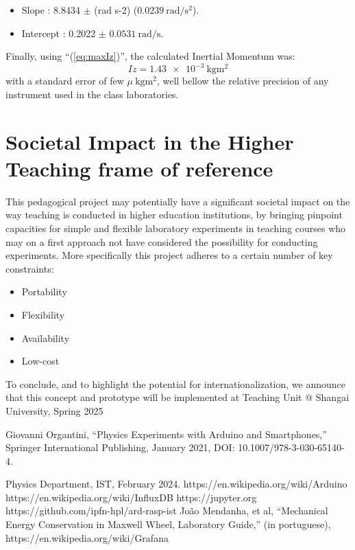 \documentclass[conference]{IEEEtran}
\begin{document}
\begin{itemize}
    \item Slope : 8.8434 $\pm$ (rad s-2) ($\SI{0.0239}{\radian\per\second\squared}$).

    \item Intercept : 0.2022 $\pm$ $\SI{0.0531}{\radian\per\second}$.
\end{itemize}

Finally, using ``(\eqref{eq:maxIz})'', the calculated Inertial Momentum was:
\begin{equation}
     Iz  = \SI{1.43e-3}{\kg\meter\squared}
\end{equation}
with a standard error of few $\mu\SI{}{\kg\meter\squared}$, well bellow the relative precision of any instrument used in the class laboratories.
  
\section{Societal Impact in the Higher Teaching frame of reference}
This pedagogical project may potentially have a significant societal impact on the way teaching is conducted in higher education institutions, 
by bringing pinpoint capacities for simple and flexible laboratory experiments in 
teaching courses who may on a first approach not have considered the possibility for conducting experiments.
More specifically this project adheres to a certain number of key constraints:
\begin{itemize}
    \item Portability
    \item Flexibility
    \item Availability
    \item Low-cost
\end{itemize}

To conclude, and to highlight the potential for internationalization, we announce that 
this concept and prototype will be implemented at Teaching Unit @ Shangai University, Spring 2025

\begin{thebibliography}{00}
Giovanni Organtini, ``Physics Experiments with Arduino and Smartphones,''
Springer International Publishing, January 2021, DOI: 10.1007/978-3-030-65140-4.

Physics Department, IST, February 2024.
 https://en.wikipedia.org/wiki/Arduino
 https://en.wikipedia.org/wiki/InfluxDB
 https://jupyter.org 
 https://github.com/ipfn-hpl/ard-rasp-ist
João Mendanha, et al, ``Mechanical Energy Conservation in Maxwell Wheel, Laboratory Guide,'' (in portuguese),
 https://en.wikipedia.org/wiki/Grafana
\end{thebibliography}
\end{document}

